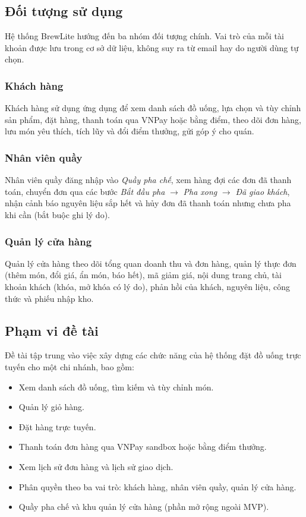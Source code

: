 \documentclass[12pt,a4paper]{article}
\begin{document}
\subsection{Đối tượng sử dụng}
Hệ thống BrewLite hướng đến ba nhóm đối tượng chính. Vai trò của mỗi tài khoản được lưu trong cơ sở dữ liệu, không suy ra từ email hay do người dùng tự chọn.

\subsubsection{Khách hàng}
Khách hàng sử dụng ứng dụng để xem danh sách đồ uống, lựa chọn và tùy chỉnh sản phẩm, đặt hàng, thanh toán qua VNPay hoặc bằng điểm, theo dõi đơn hàng, lưu món yêu thích, tích lũy và đổi điểm thưởng, gửi góp ý cho quán.

\subsubsection{Nhân viên quầy}
Nhân viên quầy đăng nhập vào \textit{Quầy pha chế}, xem hàng đợi các đơn đã thanh toán, chuyển đơn qua các bước \textit{Bắt đầu pha} $\rightarrow$ \textit{Pha xong} $\rightarrow$ \textit{Đã giao khách}, nhận cảnh báo nguyên liệu sắp hết và hủy đơn đã thanh toán nhưng chưa pha khi cần (bắt buộc ghi lý do).

\subsubsection{Quản lý cửa hàng}
Quản lý cửa hàng theo dõi tổng quan doanh thu và đơn hàng, quản lý thực đơn (thêm món, đổi giá, ẩn món, báo hết), mã giảm giá, nội dung trang chủ, tài khoản khách (khóa, mở khóa có lý do), phản hồi của khách, nguyên liệu, công thức và phiếu nhập kho.

\subsection{Phạm vi đề tài}
Đề tài tập trung vào việc xây dựng các chức năng của hệ thống đặt đồ uống trực tuyến cho một chi nhánh, bao gồm:
\begin{itemize}
  \item Xem danh sách đồ uống, tìm kiếm và tùy chỉnh món.
  \item Quản lý giỏ hàng.
  \item Đặt hàng trực tuyến.
  \item Thanh toán đơn hàng qua VNPay sandbox hoặc bằng điểm thưởng.
  \item Xem lịch sử đơn hàng và lịch sử giao dịch.
  \item Phân quyền theo ba vai trò: khách hàng, nhân viên quầy, quản lý cửa hàng.
  \item Quầy pha chế và khu quản lý cửa hàng (phần mở rộng ngoài MVP).
\end{itemize}
\end{document}
